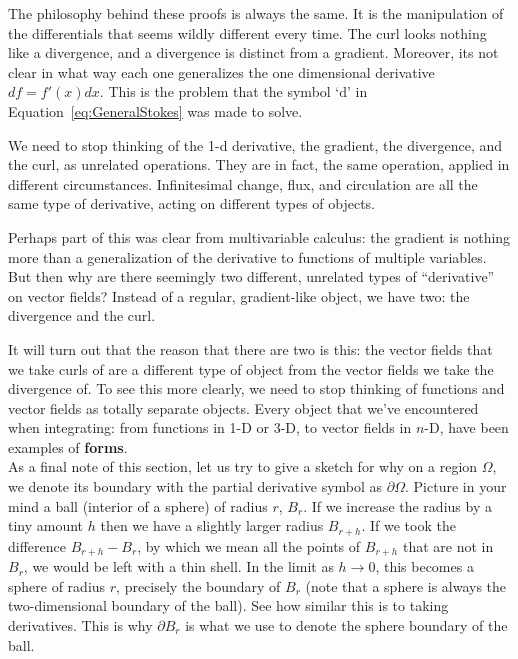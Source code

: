 \documentclass[../master.tex]{subfiles}
\begin{document}
	The philosophy behind these proofs is always the same. It is the manipulation of the differentials that seems wildly different every time. The curl looks nothing like a divergence, and a divergence is distinct from a gradient. Moreover, its not clear in what way each one generalizes the one dimensional derivative $df = f'(x) dx$. This is the problem that the symbol `$\mathrm d$' in Equation~\eqref{eq:GeneralStokes} was made to solve.
	
	We need to stop thinking of the 1-d derivative, the gradient, the divergence, and the curl, as unrelated operations. They are in fact, the same operation, applied in different circumstances. Infinitesimal change, flux, and circulation are all the same type of derivative, acting on different types of objects. 
	
	Perhaps part of this was clear from multivariable calculus: the gradient is nothing more than a generalization of the derivative to functions of multiple variables. But then why are there seemingly two different, unrelated types of ``derivative'' on vector fields? Instead of a regular, gradient-like object, we have two: the divergence and the curl. 
	
	It will turn out that the reason that there are two is this: the vector fields that we take curls of are a different type of object from the vector fields we take the divergence of.	To see this more clearly, we need to stop thinking of functions and vector fields as totally separate objects. Every object that we've encountered when integrating: from functions in 1-D or 3-D, to vector fields in $n$-D, have been examples of \textbf{forms}.  \\
	
	As a final note of this section, let us try to give a sketch for why on a region $\Omega$, we denote its boundary with the partial derivative symbol as $\partial \Omega$. Picture in your mind a ball (interior of a sphere) of radius $r$,  $B_r$. If we increase the radius by a tiny amount $h$ then we have a slightly larger radius $B_{r+h}$. If we took the difference $B_{r+h} - B_r$, by which we mean all the points of $B_{r+h}$ that are not in $B_r$, we would be left with a thin shell. In the limit as $h \rightarrow 0$, this becomes a sphere of radius $r$, precisely the boundary of $B_r$ (note that a sphere is always the two-dimensional boundary of the ball). See how similar this is to taking derivatives. This is why $\partial B_r$ is what we use to denote the sphere boundary of the ball. 
	
\end{document}
